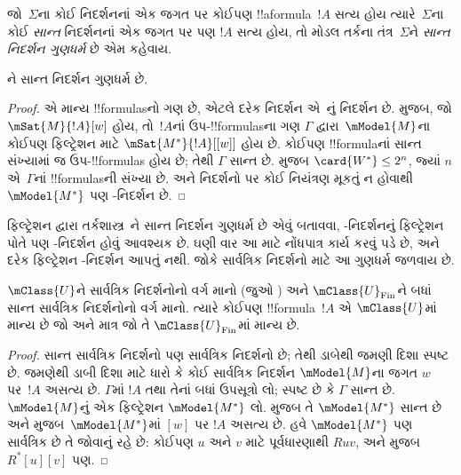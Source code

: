 \documentclass[../../../include/open-logic-section]{subfiles}
\begin{document}


\begin{defn}
  જો~$\Sigma$ના કોઈ નિદર્શનનાં એક જગત પર કોઈપણ !!a{formula}~$!A$ સત્ય હોય
  ત્યારે~$\Sigma$ના કોઈ \emph{સાન્ત} નિદર્શનનાં એક જગત પર પણ $!A$
  સત્ય હોય, તો મોડલ તર્કના તંત્ર~$\Sigma$ને \emph{સાન્ત
    નિદર્શન ગુણધર્મ} છે એમ કહેવાય.
\end{defn}

\begin{prop}
  ને સાન્ત નિદર્શન ગુણધર્મ છે.
\end{prop}

\begin{proof}
   એ માન્ય !!{formula}sનો ગણ છે, એટલે દરેક નિદર્શન
  એ~નું નિદર્શન છે.  મુજબ,
  જો $\mSat{M}{!A}[w]$ હોય, તો~$!A$નાં ઉપ-!!{formula}sના ગણ
  $\Gamma$ દ્વારા~$\mModel{M}$ના કોઈપણ ફિલ્ટ્રેશન માટે
  $\mSat{M^*}{!A}[{[w]}]$ હોય છે.
  કોઈપણ !!{formula}નાં સાન્ત સંખ્યામાં જ ઉપ-!!{formula}s હોય છે;
  તેથી $\Gamma$ સાન્ત છે.  મુજબ
  $\card{W^*} \le 2^n$, જ્યાં $n$ એ~$\Gamma$નાં
  !!{formula}sની સંખ્યા છે. અને  નિદર્શનો પર કોઈ નિયંત્રણ
  મૂકતું ન હોવાથી $\mModel{M^*}$ પણ -નિદર્શન છે.
\end{proof}

ફિલ્ટ્રેશન દ્વારા તર્કશાસ્ત્ર~ને સાન્ત નિદર્શન ગુણધર્મ છે એવું
બતાવવા, -નિદર્શનનું ફિલ્ટ્રેશન પોતે પણ -નિદર્શન
હોવું આવશ્યક છે. ઘણી વાર આ માટે નોંધપાત્ર કાર્ય કરવું પડે છે, અને
દરેક ફિલ્ટ્રેશન -નિદર્શન આપતું નથી. જોકે સાર્વત્રિક
નિદર્શનો માટે આ ગુણધર્મ જળવાય છે.

\begin{prop}
  $\mClass{U}$ને સાર્વત્રિક નિદર્શનોનો વર્ગ માનો
  (જુઓ ) અને
  $\mClass{U}_\mathrm{Fin}$ને બધાં સાન્ત સાર્વત્રિક નિદર્શનોનો વર્ગ
  માનો. ત્યારે કોઈપણ !!{formula}~$!A$ એ $\mClass{U}$માં માન્ય છે
  જો અને માત્ર જો તે $\mClass{U}_\mathrm{Fin}$માં માન્ય છે.
\end{prop}

\begin{proof}
  સાન્ત સાર્વત્રિક નિદર્શનો પણ સાર્વત્રિક નિદર્શનો છે; તેથી
  ડાબેથી જમણી દિશા સ્પષ્ટ છે. જમણેથી ડાબી દિશા માટે ધારો કે કોઈ
  સાર્વત્રિક નિદર્શન $\mModel{M}$ના જગત $w$ પર~$!A$ અસત્ય છે.
  $\Gamma$માં $!A$ તથા તેનાં બધાં ઉપસૂત્રો લો; સ્પષ્ટ છે કે
  $\Gamma$ સાન્ત છે. $\mModel{M}$નું એક ફિલ્ટ્રેશન
  $\mModel{M^*}$ લો.  મુજબ તે
  $\mModel{M^*}$ સાન્ત છે અને  મુજબ~$\mModel{M^*}$માં
  $[w]$ પર $!A$ અસત્ય છે. હવે $\mModel{M^*}$ પણ સાર્વત્રિક છે
  તે જોવાનું રહે છે: કોઈપણ $u$ અને $v$ માટે પૂર્વધારણાથી $Ruv$,
  અને %
   મુજબ $R^*[u][v]$ પણ.
\end{proof}
\end{document}
